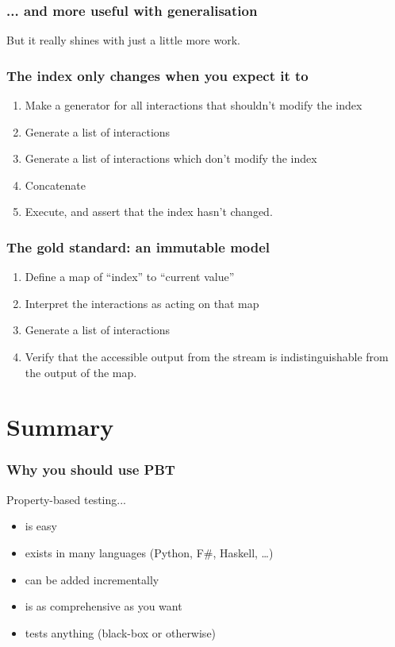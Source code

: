 \documentclass{beamer}
\begin{document}
\begin{frame}
\frametitle{... and more useful with generalisation}
But it really shines with just a little more work.
\end{frame}

\begin{frame}
\frametitle{The index only changes when you expect it to}
\begin{enumerate}
\item Make a generator for all interactions that shouldn't modify the index
\item Generate a list of interactions
\item Generate a list of interactions which don't modify the index
\item Concatenate
\item Execute, and assert that the index hasn't changed.
\end{enumerate}
\end{frame}

\begin{frame}
\frametitle{The gold standard: an immutable model}

\begin{enumerate}
\item Define a map of ``index'' to ``current value''
\item Interpret the interactions as acting on that map
\item Generate a list of interactions
\item Verify that the accessible output from the stream is indistinguishable from the output of the map.
\end{enumerate}
\end{frame}

\tableofcontents

\section*{Summary}
\begin{frame}
\frametitle{Why you should use PBT}
Property-based testing...
\begin{itemize}
\item is easy
\item exists in many languages (Python, F\#, Haskell, \dots)
\item can be added incrementally
\item is as comprehensive as you want
\item tests anything (black-box or otherwise)
\end{itemize}
\end{frame}
\end{document}
